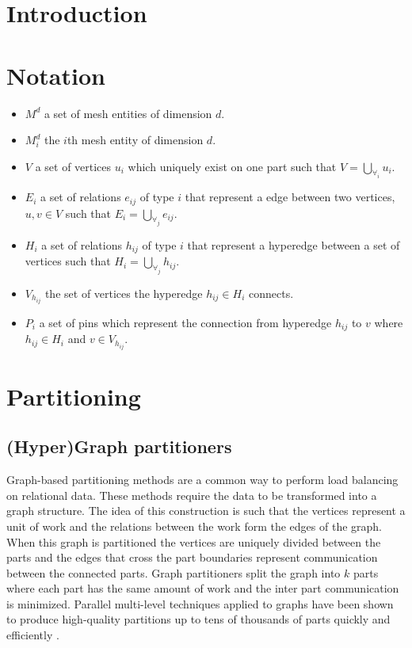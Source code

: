 
\section{Introduction}


\section{Notation}
\begin{itemize}
  \item $M^d$ a set of mesh entities of dimension $d$.
  \item $M_i^d$ the $i$th mesh entity of dimension $d$.
  \item $V$ a set of vertices $u_i$ which uniquely
    exist on one part such that $V = \bigcup_{\forall_i}u_i$.
  \item $E_i$ a set of relations $e_{ij}$ of type $i$ that represent a
    edge between two vertices, $u,v\in V$ such that $E_i = \bigcup_{\forall_j}e_{ij}$.
  \item $H_i$ a set of relations $h_{ij}$ of type $i$ that represent a
    hyperedge between a set of vertices such that $H_i = \bigcup_{\forall_j}h_{ij}$.
  \item $V_{h_{ij}}$ the set of vertices the hyperedge $h_{ij}\in H_i$ connects.
  \item $P_i$ a set of pins which represent the connection from hyperedge
        $h_{ij}$ to $v$ where $h_{ij} \in H_i$ and $v \in V_{h_{ij}}$.
\end{itemize}

\section{Partitioning}

\subsection{(Hyper)Graph partitioners}
Graph-based partitioning methods are a common way to perform
load balancing on relational data. These methods require
the data to be transformed into a graph structure. The idea of this
construction is such that the vertices represent a unit of work
and the relations between the work form the edges of the graph.
When this graph is partitioned the vertices are uniquely divided
between the parts and the edges that cross the part boundaries
represent communication between the connected parts. Graph
partitioners split the graph into $k$ parts 
where each part has the same amount of work and the inter part
communication is minimized. Parallel multi-level techniques
applied to graphs have been shown to produce high-quality
partitions up to tens of thousands of parts quickly and efficiently
\cite{catalyurek2013umpa,karypis1999parallel,lasalle2013multi,schloegel2002parallel}.

